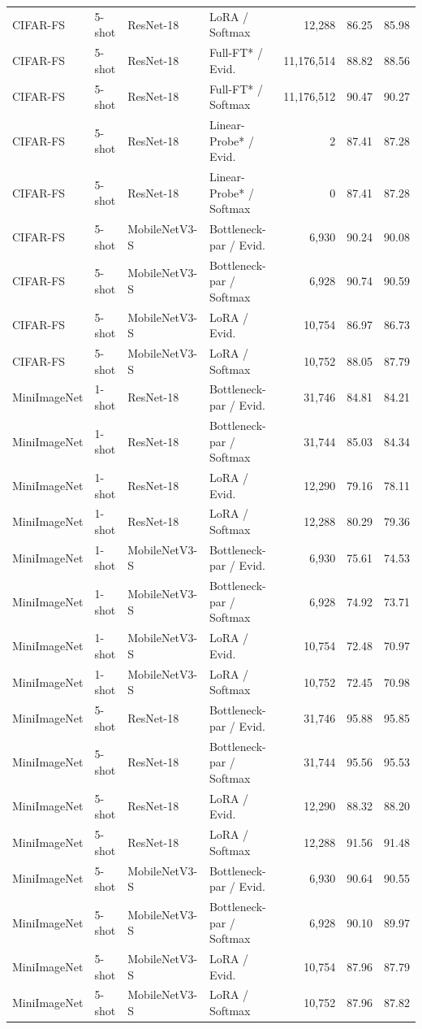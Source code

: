 \documentclass{iutbscthesis}
\begin{document}
\begin{appendices}
\begin{longtable}{ll l >{\raggedright\arraybackslash}p{3.1cm} rrr}
CIFAR-FS & 5-shot & ResNet-18 & LoRA / Softmax & 12{,}288 & 86.25 & 85.98 \\
CIFAR-FS & 5-shot & ResNet-18 & Full-FT* / Evid. & 11{,}176{,}514 & 88.82 & 88.56 \\
CIFAR-FS & 5-shot & ResNet-18 & Full-FT* / Softmax & 11{,}176{,}512 & 90.47 & 90.27 \\
CIFAR-FS & 5-shot & ResNet-18 & Linear-Probe* / Evid. & 2 & 87.41 & 87.28 \\
CIFAR-FS & 5-shot & ResNet-18 & Linear-Probe* / Softmax & 0 & 87.41 & 87.28 \\
CIFAR-FS & 5-shot & MobileNetV3-S & Bottleneck-par / Evid. & 6{,}930 & 90.24 & 90.08 \\
CIFAR-FS & 5-shot & MobileNetV3-S & Bottleneck-par / Softmax & 6{,}928 & 90.74 & 90.59 \\
CIFAR-FS & 5-shot & MobileNetV3-S & LoRA / Evid. & 10{,}754 & 86.97 & 86.73 \\
CIFAR-FS & 5-shot & MobileNetV3-S & LoRA / Softmax & 10{,}752 & 88.05 & 87.79 \\
MiniImageNet & 1-shot & ResNet-18 & Bottleneck-par / Evid. & 31{,}746 & 84.81 & 84.21 \\
MiniImageNet & 1-shot & ResNet-18 & Bottleneck-par / Softmax & 31{,}744 & 85.03 & 84.34 \\
MiniImageNet & 1-shot & ResNet-18 & LoRA / Evid. & 12{,}290 & 79.16 & 78.11 \\
MiniImageNet & 1-shot & ResNet-18 & LoRA / Softmax & 12{,}288 & 80.29 & 79.36 \\
MiniImageNet & 1-shot & MobileNetV3-S & Bottleneck-par / Evid. & 6{,}930 & 75.61 & 74.53 \\
MiniImageNet & 1-shot & MobileNetV3-S & Bottleneck-par / Softmax & 6{,}928 & 74.92 & 73.71 \\
MiniImageNet & 1-shot & MobileNetV3-S & LoRA / Evid. & 10{,}754 & 72.48 & 70.97 \\
MiniImageNet & 1-shot & MobileNetV3-S & LoRA / Softmax & 10{,}752 & 72.45 & 70.98 \\
MiniImageNet & 5-shot & ResNet-18 & Bottleneck-par / Evid. & 31{,}746 & 95.88 & 95.85 \\
MiniImageNet & 5-shot & ResNet-18 & Bottleneck-par / Softmax & 31{,}744 & 95.56 & 95.53 \\
MiniImageNet & 5-shot & ResNet-18 & LoRA / Evid. & 12{,}290 & 88.32 & 88.20 \\
MiniImageNet & 5-shot & ResNet-18 & LoRA / Softmax & 12{,}288 & 91.56 & 91.48 \\
MiniImageNet & 5-shot & MobileNetV3-S & Bottleneck-par / Evid. & 6{,}930 & 90.64 & 90.55 \\
MiniImageNet & 5-shot & MobileNetV3-S & Bottleneck-par / Softmax & 6{,}928 & 90.10 & 89.97 \\
MiniImageNet & 5-shot & MobileNetV3-S & LoRA / Evid. & 10{,}754 & 87.96 & 87.79 \\
MiniImageNet & 5-shot & MobileNetV3-S & LoRA / Softmax & 10{,}752 & 87.96 & 87.82 \\
\end{longtable}
\endgroup


\end{appendices}
\end{document}
